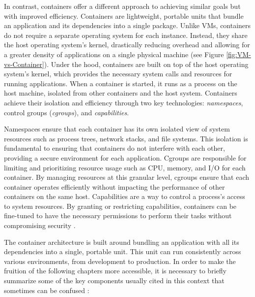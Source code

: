 In contrast, containers offer a different approach to achieving similar goals
but with improved efficiency. Containers are lightweight, portable units that
bundle an application and its dependencies into a single package.
Unlike VMs, containers do not require a separate operating system for each
instance. Instead, they share the host operating system's kernel, drastically
reducing overhead and allowing for a greater density of applications on a single
physical machine (see Figure \ref{fig:VM-vs-Container}).
Under the hood, containers are built on top of the host operating system's
kernel, which provides the necessary system calls and resources for running
applications. When a container is started, it runs as a process on the host
machine, isolated from other containers and the host system.
Containers achieve their isolation and efficiency through two key technologies:
\textit{namespaces}, control groups (\textit{cgroups}), and
\textit{capabilities}.

Namespaces ensure that each container has its own isolated view of system
resources such as process trees, network stacks, and file systems. This
isolation is fundamental to ensuring that containers do not interfere with each
other, providing a secure environment for each application.
Cgroups are responsible for limiting and prioritizing resource usage such as
CPU, memory, and I/O for each container. By managing resources at this granular
level, cgroups ensure that each container operates efficiently without impacting
the performance of other containers on the same host.
Capabilities are a way to control a process's access to system resources. By
granting or restricting capabilities, containers can be fine-tuned to have the
necessary permissions to perform their tasks without compromising security
\cite{kerris2021}.


The container architecture is built around bundling an application with all its
dependencies into a single, portable unit. This unit can run consistently across
various environments, from development to production.
In order to make the fruition of the following chapters more accessible, it is
necessary to briefly summarize some of the key components usually cited in this
context that sometimes can be confused \cite{walsh2022, huawei2023}:

